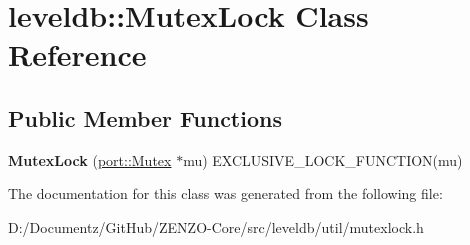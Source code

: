 \hypertarget{classleveldb_1_1_mutex_lock}{}\section{leveldb\+::Mutex\+Lock Class Reference}
\label{classleveldb_1_1_mutex_lock}
\subsection*{Public Member Functions}
\begin{DoxyCompactItemize}
\item 
\mbox{\label{classleveldb_1_1_mutex_lock_a1501eaa9a404460e06d47468e0e04ef2}} 
{\bfseries Mutex\+Lock} (\mbox{\hyperlink{classleveldb_1_1port_1_1_mutex}{port\+::\+Mutex}} $\ast$mu) E\+X\+C\+L\+U\+S\+I\+V\+E\+\_\+\+L\+O\+C\+K\+\_\+\+F\+U\+N\+C\+T\+I\+ON(mu)
\end{DoxyCompactItemize}


The documentation for this class was generated from the following file\+:\begin{DoxyCompactItemize}
\item 
D\+:/\+Documentz/\+Git\+Hub/\+Z\+E\+N\+Z\+O-\/\+Core/src/leveldb/util/mutexlock.\+h\end{DoxyCompactItemize}
